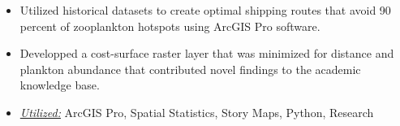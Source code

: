 \documentclass[10pt,a4paper,ragged2e]{altacv}
\begin{document}
\begin{itemize}
  \item Utilized historical datasets to create optimal shipping routes that avoid 90 percent of zooplankton hotspots using ArcGIS Pro software.
  \item Developped a cost-surface raster layer that was minimized for distance and plankton abundance that contributed novel findings to the academic knowledge base.
  \item \underline{\textit{Utilized:}} ArcGIS Pro, Spatial Statistics, Story Maps, Python, Research
\end{itemize}


\clearpage
\nocite{*}
\end{document}
